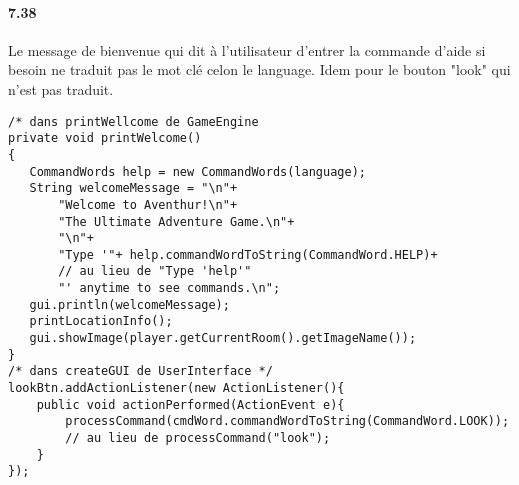 \documentclass[11pt,a4paper]{report}
\begin{document}
\paragraph{7.38}
Le message de bienvenue qui dit à l'utilisateur d'entrer la commande d'aide si besoin ne traduit pas le mot clé celon le language. Idem pour le bouton "look" qui n'est pas traduit.
\begin{lstlisting}
/* dans printWellcome de GameEngine
private void printWelcome()
{
   CommandWords help = new CommandWords(language);
   String welcomeMessage = "\n"+
       "Welcome to Aventhur!\n"+
       "The Ultimate Adventure Game.\n"+
       "\n"+
       "Type '"+ help.commandWordToString(CommandWord.HELP)+
       // au lieu de "Type 'help'"
       "' anytime to see commands.\n";
   gui.println(welcomeMessage);
   printLocationInfo();
   gui.showImage(player.getCurrentRoom().getImageName());
}
/* dans createGUI de UserInterface */
lookBtn.addActionListener(new ActionListener(){
    public void actionPerformed(ActionEvent e){
        processCommand(cmdWord.commandWordToString(CommandWord.LOOK));
        // au lieu de processCommand("look");
    }
});
\end{lstlisting}
\end{document}
